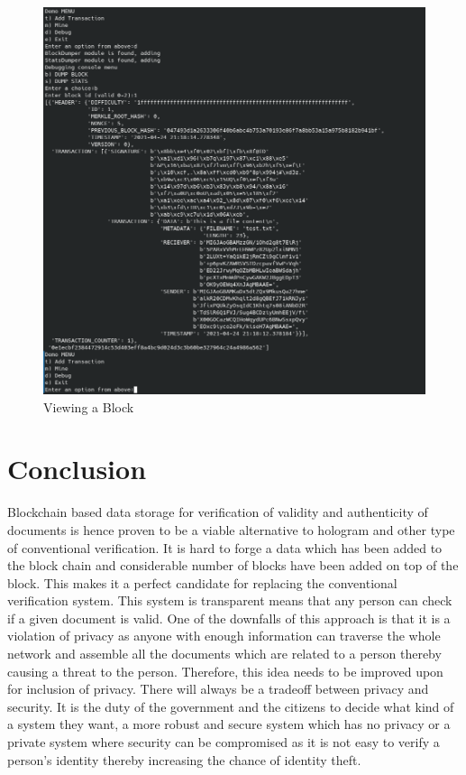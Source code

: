 \documentclass[conference]{IEEEtran}
\begin{document}
\begin{figure}[h]
	\centering
	\includegraphics[width=0.7\linewidth]{ViewBlock}
	\caption{Viewing a Block}
	\label{fig:viewblock}
\end{figure}


\section{Conclusion}
Blockchain based data storage for verification of validity and authenticity of documents is hence proven to be a viable alternative to hologram and other type of conventional verification. It is hard to forge a data which has been added to the block chain and considerable number of blocks have been added on top of the block. This makes it a perfect candidate for replacing the conventional verification system. This system is transparent means that any person can check if a given document is valid. One of the downfalls of this approach is that it is a violation of privacy as anyone with enough information can traverse the whole network and assemble all the documents which are related to a person thereby causing a threat to the person. Therefore, this idea needs to be improved upon for inclusion of privacy. There will always be a tradeoff between privacy and security. It is the duty of the government and the citizens to decide what kind of a system they want, a more robust and secure system which has no privacy or a private system where security can be compromised as it is not easy to verify a person’s identity thereby increasing the chance of identity theft. 
\end{document}
